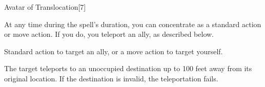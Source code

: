 \begin{spellsection}{Avatar of Translocation}[7]
    \begin{spellheader}
    \end{spellheader}
    \begin{spellcontent}
        \begin{spelltargetinginfo}
        \end{spelltargetinginfo}
        \begin{spelleffects}
            \spelleffect At any time during the spell's duration, you can concentrate as a standard action or move action. If you do, you teleport an ally, as described below.
            \spelldur \durlong
        \end{spelleffects}
    \end{spellcontent}
    \begin{spellsubcontent}
        \begin{spelltargetinginfo}

            \spelltime Standard action to target an ally, or a move action to target yourself.
        \end{spelltargetinginfo}
        \begin{spelleffects}
            \spelleffect The target teleports to an unoccupied destination up to 100 feet away from its original location. If the destination is invalid, the teleportation fails.
        \end{spelleffects}
    \end{spellsubcontent}
    \begin{spellfooter}
        \miscastexplode
    \end{spellfooter}
    \begin{spellaugments}
    \end{spellaugments}
\end{spellsection}

